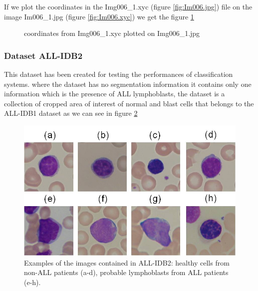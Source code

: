 If we plot the coordinates in the Img006\_1.xyc (figure \ref{fig:Im006.jpg}) file on the image Im006\_1.jpg (figure \ref{fig:Im006.xyc}) we get the figure \ref{fig:Im006.xyc.jpg}

\begin{figure}[H]
\centering
\caption{coordinates from Img006\_1.xyc plotted on Img006\_1.jpg}
\label{fig:Im006.xyc.jpg}
\end{figure}

\subsubsection{Dataset ALL-IDB2}
\hspace{\parindent}
This dataset has been created for testing the performances of classification systems. where the dataset has no segmentation information it contains only one information which is the presence of ALL lymphoblasts, the dataset is a collection of cropped area of interest of normal and blast cells that belongs to the ALL-IDB1 dataset as we can see in figure \ref{fig:ALL-IDB2}

\begin{figure}[H]
\centering
\includegraphics{../images/ALL-IDB2.jpg}
\caption{Examples of the images contained in ALL-IDB2: healthy cells from non-ALL patients (a-d), probable lymphoblasts from ALL patients (e-h).}
\label{fig:ALL-IDB2}
\end{figure}

